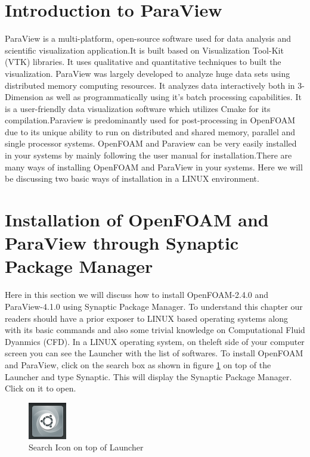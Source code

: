 \documentclass[a4paper,12pt]{report}
\begin{document}
 \section{Introduction to ParaView}
 \flushleft ParaView is a multi-platform, open-source software used for data analysis and scientific visualization application.It is built based on Visualization Tool-Kit (VTK) libraries. It uses qualitative and quantitative techniques to built the visualization. ParaView was largely developed to analyze huge data sets using distributed memory computing resources. It analyzes data interactively both in 3-Dimension as well as programmatically using it's batch processing capabilities. 
 \flushleft It is a user-friendly data visualization software which utilizes Cmake for its compilation.Paraview is predominantly used for post-processing in OpenFOAM due to its unique ability to run on distributed and shared memory, parallel and single processor systems.
 \flushleft OpenFOAM and Paraview can be very easily installed in your systems by mainly following the user manual for installation.There are many ways of installing OpenFOAM and ParaView in your systems. Here we will be discussing two basic ways of installation in a LINUX environment.
 
 \section{Installation of OpenFOAM and ParaView through Synaptic Package Manager}
 \flushleft Here in this section we will discuss how to install OpenFOAM-2.4.0 and ParaView-4.1.0 using Synaptic Package Manager. To understand this chapter our readers should have a prior exposer to LINUX based operating systems along with its basic commands and also some trivial knowledge on Computational Fluid Dyanmics (CFD). 
 \flushleft In a LINUX operating system, on theleft side of your computer screen you can see the Launcher with the list of softwares.
 \flushleft To install OpenFOAM and ParaView, click on the search box as shown in figure \ref{2} on top of the Launcher and type Synaptic. This will display the Synaptic Package Manager. Click on it to open.
 
\begin{figure}[h]  
\begin{center}  
\includegraphics[scale=0.8]{2.png}
\caption{Search Icon on top of Launcher}
\label{2}
\end{center}  
\end{figure}
 
\end{document}
